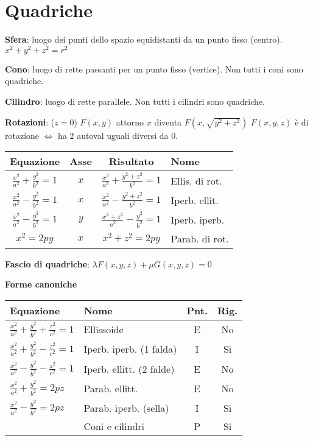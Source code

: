 \section{Quadriche}

\textbf{Sfera}: luogo dei punti dello spazio equidistanti da un punto fisso (centro). $x^2+y^2+z^2=r^2$

\textbf{Cono}: luogo di rette passanti per un punto fisso (vertice). Non tutti i coni sono quadriche.

\textbf{Cilindro}: luogo di rette parallele. Non tutti i cilindri sono quadriche.

\textbf{Rotazioni}: ($z = 0$) $F(x, y)$ attorno $x$ diventa $F(x, \sqrt{y^2+z^2})$
$F(x,y,z)$ è di rotazione $\iff$ ha 2 autoval uguali diversi da 0.

\begin{tabular}{cccl}
	\textbf{Equazione} & \textbf{Asse} & \textbf{Risultato} & \textbf{Nome} \\
	\hline
	$\frac{x^2}{a^2}+\frac{y^2}{b^2}=1$ & $x$ & $\frac{x^2}{a^2}+\frac{y^2+z^2}{b^2}=1$ & Ellis. di rot. \\
	$\frac{x^2}{a^2}-\frac{y^2}{b^2}=1$ & $x$ & $\frac{x^2}{a^2}-\frac{y^2+z^2}{b^2}=1$ & Iperb. ellit. \\
	$\frac{x^2}{a^2}-\frac{y^2}{b^2}=1$ & $y$ & $\frac{x^2+z^2}{a^2}-\frac{y^2}{b^2}=1$ & Iperb. iperb. \\
	$x^2=2py$ & $x$ & $x^2+z^2=2py$ & Parab. di rot.
\end{tabular}

\textbf{Fascio di quadriche}: $\lambda F(x, y, z) + \mu G(x, y, z) = 0$

\textbf{Forme canoniche}
\begin{tabular}{llcc}
	\textbf{Equazione} & \textbf{Nome} & \textbf{Pnt.} & \textbf{Rig.} \\
	\hline
	$\frac{x^2}{a^2} + \frac{y^2}{b^2} + \frac{z^2}{c^2} = 1$ & Ellissoide & E & No \\
	$\frac{x^2}{a^2} + \frac{y^2}{b^2} - \frac{z^2}{c^2} = 1$ & Iperb. iperb. (1 falda) & I & Si \\
	$\frac{x^2}{a^2} - \frac{y^2}{b^2} - \frac{z^2}{c^2} = 1$ & Iperb. ellitt. (2 falde) & E & No \\
	$\frac{x^2}{a^2} + \frac{y^2}{b^2} = 2pz$ & Parab. ellitt. & E & No \\
	$\frac{x^2}{a^2} - \frac{y^2}{b^2} = 2pz$ & Parab. iperb. (sella) & I & Si \\
	 & Coni e cilindri & P & Si \\
\end{tabular}

